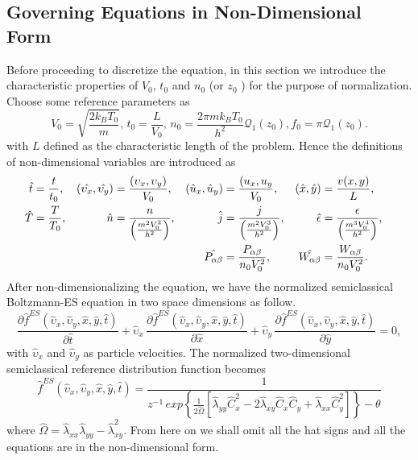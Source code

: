 \documentclass{rsproca}%
\begin{document}
\subsection{Governing Equations in Non-Dimensional Form}
\label{subsec:3_1}
Before proceeding to discretize the equation, in this section we introduce the characteristic properties of $V_0$, $t_0$ and $n_0$ (or $z_0$ ) for the purpose of normalization.  Choose some reference parameters as
\begin{equation}
V_0 = \sqrt{\frac{2k_B T_0}{m}}, \, t_0 = \frac{L}{V_0},\, n_{0} = \frac{2 \pi m k_B T_0}{h^2} \mathcal{Q}_1 (z_0), f_0=\pi \mathcal{Q}_1(z_0).
\end{equation}
with $L$ defined as the characteristic length of the problem. Hence the definitions of non-dimensional variables are introduced as
\begin{align}
\hat{t} &=\frac{t}{t_0},& (\hat{\upsilon_x}, \hat{\upsilon_y})&={(\upsilon_x,\upsilon_y)\over V_0},&
(\hat{u}_x,\hat{u}_y)&=\frac{(u_x,u_y}{V_0},& (\hat{x},\hat{y})&=\frac{v(x, y)}{L},& \nonumber \\
\hat{T}&=\frac{T}{T_0},& \hat{n}&={n \over \left(\frac{m^2V_0^2}{h^2}\right)},&
\hat{j}&={j \over \left(\frac{m^2V_{0}^3}{h^2}\right) },& \hat{\epsilon}&={\epsilon \over \left(\frac{m^3 V_{0}^4}{h^2}\right)},& \nonumber \\
& & & &\hat{P_{\alpha \beta}} &= { P_{\alpha \beta} \over n_{0} V_{0}^2 },& \hat{W_{\alpha \beta}} &= { W_{\alpha \beta} \over n_{0} V_0^2}.&
\end{align}
After non-dimensionalizing the equation, we have the normalized semiclassical Boltzmann-ES equation in two space dimensions as follow.
\begin{equation}
\frac{\partial\hat{f}^{ES}(\hat{\upsilon}_x,\hat{\upsilon}_y,\hat{x},\hat{y},\hat{t})}{\partial\hat{t}} + \hat{\upsilon}_x\,\frac{\partial\hat{f}^{ES}(\hat{\upsilon}_x,\hat{\upsilon}_y,\hat{x},\hat{y},\hat{t})}{\partial\hat{x}} + \hat{\upsilon}_y\,\frac{\partial\hat{f}^{ES}(\hat{\upsilon}_x,\hat{\upsilon}_y,\hat{x},\hat{y},\hat{t})}{\partial\hat{y}} = 0, \label{normalizedes}
\end{equation}
with $\hat{\upsilon}_x$ and $\hat{\upsilon}_y$ as particle velocities. The normalized two-dimensional semiclassical reference distribution function becomes
\begin{equation}
\hat{f}^{ES}\left(\hat{\upsilon}_x,\hat{\upsilon}_y,\hat{x},\hat{y},\hat{t}\right) =
\frac{1}{z^{-1}\,exp\left\{ \frac{1}{2 \hat{\Omega}} \left[ \hat{\lambda}_{yy} \hat{C}_x^2 - 2
\hat{\lambda}_{xy} \hat{C}_x \hat{C}_y + \hat{\lambda}_{xx} \hat{C}_y^2 \right]  \right\} - \theta }
\end{equation}
where $\hat{\Omega} = \hat{\lambda}_{xx} \hat{ \lambda}_{yy} - \hat{\lambda}_{xy}^2$.
From here on we shall omit all the hat signs and all the equations are in the non-dimensional form.
\end{document}

